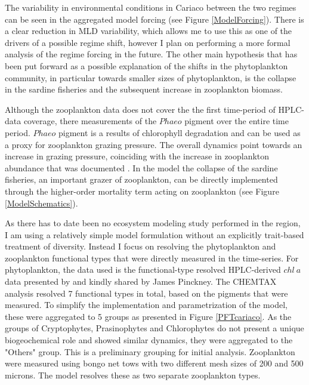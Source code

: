 The variability in environmental conditions in Cariaco between the two regimes can be seen in the aggregated model forcing (see Figure \ref{ModelForcing}). There is a clear reduction in MLD variability, which allows me to use this as one of the drivers of a possible regime shift, however I plan on performing a more formal analysis of the regime forcing in the future. The other main hypothesis that has been put forward as a possible explanation of the shifts in the phytoplankton community, in particular towards smaller sizes of phytoplankton, is the collapse in the sardine fisheries and the subsequent increase in zooplankton biomass. 

Although the zooplankton data does not cover the the first time-period of HPLC-data coverage, there measurements of the $Phaeo$ pigment over the entire time period. $Phaeo$ pigment is a results of chlorophyll degradation and can be used as a proxy for zooplankton grazing pressure. The overall dynamics point towards an increase in grazing pressure, coinciding with the increase in zooplankton abundance that was documented \citep{Pinckney2015}. In the model the collapse of the sardine fisheries, an important grazer of zooplankton, can be directly implemented through the higher-order mortality term acting on zooplankton (see Figure \ref{ModelSchematics}). 

As there has to date been no ecosystem modeling study performed in the region, I am using a relatively simple model formulation without an explicitly trait-based treatment of diversity. Instead I focus on resolving the phytoplankton and zooplankton functional types that were directly measured in the time-series. For phytoplankton, the data used is the functional-type resolved HPLC-derived $chl~a$ data presented by \citet{Pinckney2015} and kindly shared by James Pinckney. The CHEMTAX analysis resolved 7 functional types in total, based on the pigments that were measured. To simplify the implementation and parametrization of the model, these were aggregated to 5 groups as presented in Figure \ref{PFTcariaco}. As the groups of Cryptophytes, Prasinophytes and Chlorophytes do not present a unique biogeochemical role and showed similar dynamics, they were aggregated to the "Others" group. This is a preliminary grouping for initial analysis. Zooplankton were measured using bongo net tows with two different mesh sizes of 200 and 500 microns. The model resolves these as two separate zooplankton types.





